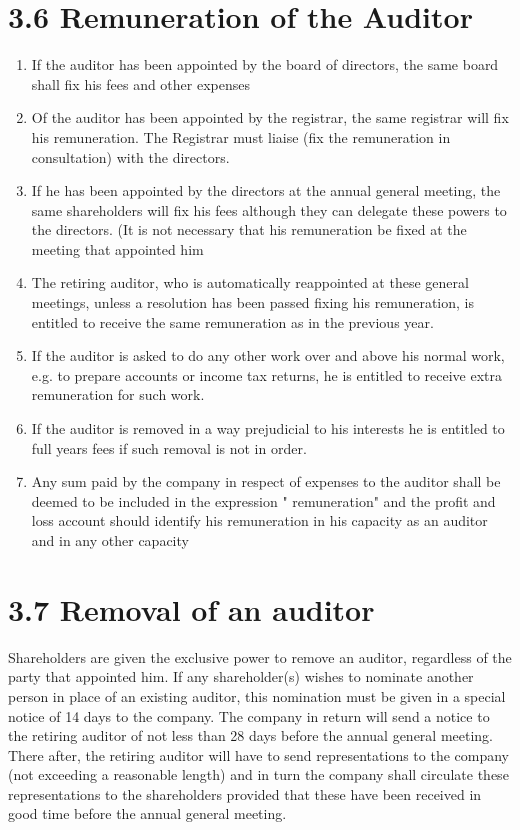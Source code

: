 \documentclass[10pt]{article}
\begin{document}
\section*{3.6 Remuneration of the Auditor}
\begin{enumerate}
  \item If the auditor has been appointed by the board of directors, the same board shall fix his fees and other expenses
  \item Of the auditor has been appointed by the registrar, the same registrar will fix his remuneration. The Registrar must liaise (fix the remuneration in consultation) with the directors.
  \item If he has been appointed by the directors at the annual general meeting, the same shareholders will fix his fees although they can delegate these powers to the directors. (It is not necessary that his remuneration be fixed at the meeting that appointed him
  \item The retiring auditor, who is automatically reappointed at these general meetings, unless a resolution has been passed fixing his remuneration, is entitled to receive the same remuneration as in the previous year.
  \item If the auditor is asked to do any other work over and above his normal work, e.g. to prepare accounts or income tax returns, he is entitled to receive extra remuneration for such work.
  \item If the auditor is removed in a way prejudicial to his interests he is entitled to full years fees if such removal is not in order.
  \item Any sum paid by the company in respect of expenses to the auditor shall be deemed to be included in the expression " remuneration" and the profit and loss account should identify his remuneration in his capacity as an auditor and in any other capacity
\end{enumerate}

\section*{3.7 Removal of an auditor}
Shareholders are given the exclusive power to remove an auditor, regardless of the party that appointed him. If any shareholder(s) wishes to nominate another person in place of an existing auditor, this nomination must be given in a special notice of 14 days to the company. The company in return will send a notice to the retiring auditor of not less than 28 days before the annual general meeting. There after, the retiring auditor will have to send representations to the company (not exceeding a reasonable length) and in turn the company shall circulate these representations to the shareholders provided that these have been received in good time before the annual general meeting.
\end{document}
